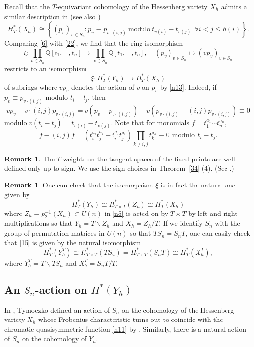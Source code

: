 \documentclass[11pt]{article}
\theoremstyle{definition}
\newtheorem{remark}[theo]{Remark}
\numberwithin{equation}{section}
\numberwithin{equation}{section}
\newcommand{\Q}{\mathbb{Q}}
\newcommand\lra{\longrightarrow }
\newcommand\beq{\begin{equation}}
\newcommand\eeq{\end{equation}}
\begin{document}
Recall that the $T$-equivariant cohomology of the Hessenberg variety $X_h$ admits a similar description in \cite{Tym} (see also \cite[\S8]{AHHM})
\beq\label{22} H^*_T(X_h)\cong \left \{(p_v)_{v\in S_n}: 
p_v\equiv p_{v\cdot (i,j)} \mathrm{~modulo~} t_{v(i)}-t_{v(j)} \ \ \forall  i<j\leq h(i)\right \}.\eeq
Comparing \eqref{6} with \eqref{22}, we find that the ring isomorphism
\beq \label{15} \xi: \prod_{v\in S_n}\Q[t_1,\cdots ,t_n]\lra \prod_{v\in S_n}\Q[t_1,\cdots ,t_n], \quad (p_v)_{v\in S_n}\mapsto (vp_v)_{v\in S_n}\eeq
restricts to an isomorphism 
\beq\label{n49}
\xi: H^*_T(Y_h)\lra H^*_T(X_h)\eeq 
of subrings \cite[p.16689]{AB} where $vp_v$ denotes the action of $v$ on $p_v$ by \eqref{n13}. 
Indeed, if $p_v\equiv p_{v\cdot (i,j)}$ modulo $t_i-t_j$, then 
\[vp_v-v\cdot (i,j)p_{v\cdot (i,j)}=v(p_v-p_{v\cdot (i,j)})+v(p_{v\cdot (i,j)}-(i,j)p_{v\cdot (i,j)})\equiv 0\]
modulo $v(t_i-t_j)=t_{v(i)}-t_{v(j)}$. Note that for monomials $f=t_1^{a_1}\cdots t_n^{a_n}$, 
\[f-(i,j)f=(t_i^{a_i}t_j^{a_j}-t_i^{a_j}t_j^{a_i})\prod_{k\neq i,j}t_k^{a_k}\equiv 0~\mathrm{~modulo~}~t_i-t_j.\] 

\begin{remark}
	The $T$-weights on the tangent spaces of the fixed points are well defined only up to sign. We use the sign choices in Theorem~\ref{34} (4). (See \cite[(10) and p.16687]{AB}.)
\end{remark}
\begin{remark}\label{n14}
	One can check that the isomorphism $\xi$ is in fact the natural one given by 
	$$H^*_T(Y_h)\cong H^*_{T\times T}(Z_h)\cong H^*_T(X_h)$$ 
	where $Z_h=p_2^{-1}(X_h)\subset U(n)$ in \eqref{n5} is acted on by $T\times T$ by left and right multiplications so that $Y_h=T\backslash Z_h$ and $X_h=Z_h/T$. 
	If we identify $S_n$ with the group of permutation matrices in $U(n)$ so that $TS_n=S_nT$, 
	one can easily check that \eqref{15} is given by the natural isomorphism 
	$$H^*_T(Y_h^T)\cong H^*_{T\times T}(TS_n)=H^*_{T\times T}(S_nT)\cong H^*_T(X_h^T),$$ 
	where $Y_h^T=T\backslash TS_n$ and $X_h^T=S_nT/T$.
\end{remark}





\subsection{An \texorpdfstring{$S_n$}{Sn}-action on \texorpdfstring{$H^*(Y_h)$}{H*(Yh)}} 
In \cite{Tym}, Tymoczko defined an action of $S_n$ on the cohomology of the Hessenberg variety $X_h$ whose Frobenius characteristic turns out to coincide with the chromatic quasisymmetric function \eqref{n11} by \cite{BC, GP2}.
Similarly, there is a natural action of $S_n$ on the cohomology of $Y_h$.
\end{document}
